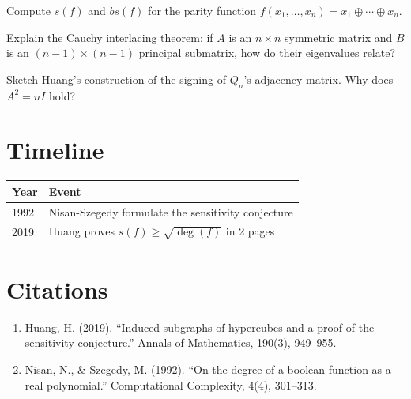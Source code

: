 \begin{exercise}[Basic]
Compute $s(f)$ and $bs(f)$ for the parity function $f(x_1, \ldots, x_n) = x_1 \oplus \cdots \oplus x_n$.
\end{exercise}

\begin{exercise}[Intermediate]
Explain the Cauchy interlacing theorem: if $A$ is an $n \times n$ symmetric matrix and $B$ is an $(n-1) \times (n-1)$ principal submatrix, how do their eigenvalues relate?
\end{exercise}

\begin{exercise}[Challenge]
Sketch Huang's construction of the signing of $Q_n$'s adjacency matrix. Why does $A^2 = nI$ hold?
\end{exercise}

\section{Timeline}

\begin{tabularx}{\linewidth}{lX}
\toprule
\textbf{Year} & \textbf{Event} \\ \midrule
1992 & Nisan-Szegedy formulate the sensitivity conjecture \\
2019 & Huang proves $s(f) \ge \sqrt{\deg(f)}$ in 2 pages \\
\bottomrule
\end{tabularx}

\section{Citations}

\begin{enumerate}
\item Huang, H. (2019). ``Induced subgraphs of hypercubes and a proof of the sensitivity conjecture.'' Annals of Mathematics, 190(3), 949--955.
\item Nisan, N., \& Szegedy, M. (1992). ``On the degree of a boolean function as a real polynomial.'' Computational Complexity, 4(4), 301--313.
\end{enumerate}
